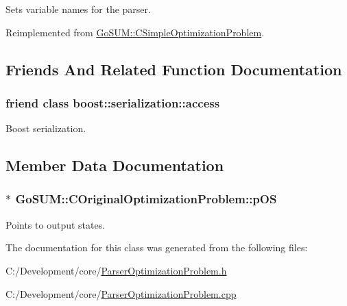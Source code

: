 Sets variable names for the parser. 



Reimplemented from \hyperlink{class_go_s_u_m_1_1_c_simple_optimization_problem_a051a218199a044cd97ba46a1cf9175f7}{Go\-S\-U\-M\-::\-C\-Simple\-Optimization\-Problem}.



\subsection{Friends And Related Function Documentation}
\hypertarget{class_go_s_u_m_1_1_c_original_optimization_problem_ac98d07dd8f7b70e16ccb9a01abf56b9c}{
\subsubsection[{boost\-::serialization\-::access}]{\setlength{\rightskip}{0pt plus 5cm}friend class boost\-::serialization\-::access\hspace{0.3cm}{\ttfamily [friend]}}}\label{class_go_s_u_m_1_1_c_original_optimization_problem_ac98d07dd8f7b70e16ccb9a01abf56b9c}


Boost serialization. 



\subsection{Member Data Documentation}
\hypertarget{class_go_s_u_m_1_1_c_original_optimization_problem_a7c3c4d727506f3c503768d70c7fd0f73}{
\subsubsection[{p\-O\-S}]{$\ast$ Go\-S\-U\-M\-::\-C\-Original\-Optimization\-Problem\-::p\-O\-S\hspace{0.3cm}{\ttfamily [protected]}}}\label{class_go_s_u_m_1_1_c_original_optimization_problem_a7c3c4d727506f3c503768d70c7fd0f73}
Points to output states. 

The documentation for this class was generated from the following files\-:\begin{DoxyCompactItemize}
\item 
C\-:/\-Development/core/\hyperlink{_parser_optimization_problem_8h}{Parser\-Optimization\-Problem.\-h}\item 
C\-:/\-Development/core/\hyperlink{_parser_optimization_problem_8cpp}{Parser\-Optimization\-Problem.\-cpp}\end{DoxyCompactItemize}
